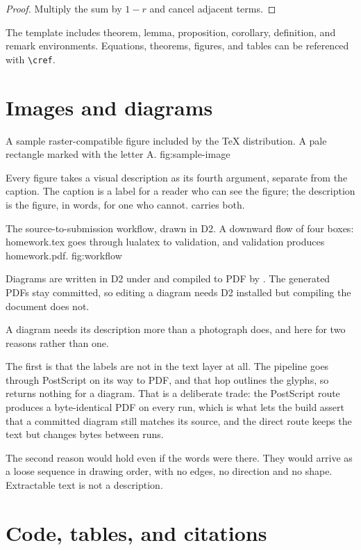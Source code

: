 \documentclass[letterpaper,11pt]{article}
\begin{document}
\begin{proof}
  Multiply the sum by $1-r$ and cancel adjacent terms.
\end{proof}

The template includes theorem, lemma, proposition, corollary, definition, and remark environments.
Equations, theorems, figures, and tables can be referenced with \verb|\cref|.

\section{Images and diagrams}

  {A sample raster-compatible figure included by the TeX distribution.}
  {A pale rectangle marked with the letter A.}
  {fig:sample-image}

Every figure takes a visual description as its fourth argument, separate from the caption.
The caption is a label for a reader who can see the figure; the description is the figure, in words, for one who cannot.
 carries both.

  {The source-to-submission workflow, drawn in D2.}
  {A downward flow of four boxes: homework.tex goes through lualatex to validation, and validation produces homework.pdf.}
  {fig:workflow}

Diagrams are written in D2 under  and compiled to PDF by .
The generated PDFs stay committed, so editing a diagram needs D2 installed but compiling the document does not.

A diagram needs its description more than a photograph does, and here for two reasons rather than one.

The first is that the labels are not in the text layer at all.
The pipeline goes through PostScript on its way to PDF, and that hop outlines the glyphs, so  returns nothing for a diagram.
That is a deliberate trade: the PostScript route produces a byte-identical PDF on every run, which is what lets the build assert that a committed diagram still matches its source, and the direct route keeps the text but changes bytes between runs.

The second reason would hold even if the words were there.
They would arrive as a loose sequence in drawing order, with no edges, no direction and no shape.
Extractable text is not a description.

\section{Code, tables, and citations}
\end{document}

